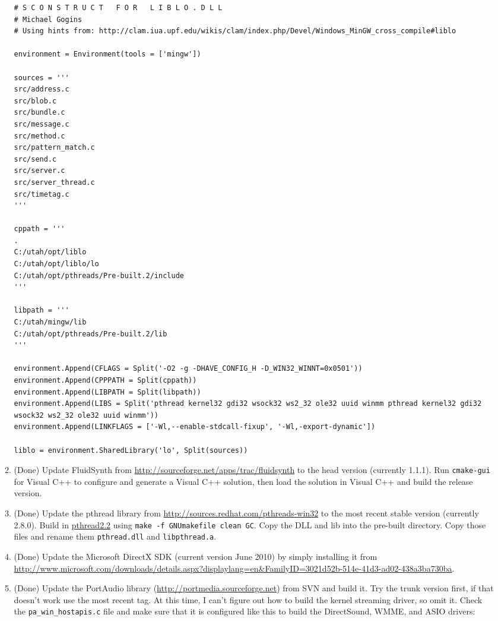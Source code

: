 \documentclass[11pt,letterpaper,onecolumn]{scrartcl}
\begin{document}
\begin{sloppypar}
\begin{enumerate}
\begin{enumerate}
\begin{lstlisting}
# S C O N S T R U C T   F O R   L I B L O . D L L
# Michael Gogins
# Using hints from: http://clam.iua.upf.edu/wikis/clam/index.php/Devel/Windows_MinGW_cross_compile#liblo

environment = Environment(tools = ['mingw'])

sources = '''
src/address.c
src/blob.c
src/bundle.c
src/message.c
src/method.c
src/pattern_match.c
src/send.c
src/server.c
src/server_thread.c
src/timetag.c
'''

cppath = '''
.
C:/utah/opt/liblo
C:/utah/opt/liblo/lo
C:/utah/opt/pthreads/Pre-built.2/include
'''

libpath = '''
C:/utah/mingw/lib
C:/utah/opt/pthreads/Pre-built.2/lib
'''

environment.Append(CFLAGS = Split('-O2 -g -DHAVE_CONFIG_H -D_WIN32_WINNT=0x0501'))
environment.Append(CPPPATH = Split(cppath))
environment.Append(LIBPATH = Split(libpath))
environment.Append(LIBS = Split('pthread kernel32 gdi32 wsock32 ws2_32 ole32 uuid winmm pthread kernel32 gdi32 wsock32 ws2_32 ole32 uuid winmm'))
environment.Append(LINKFLAGS = ['-Wl,--enable-stdcall-fixup', '-Wl,-export-dynamic'])

liblo = environment.SharedLibrary('lo', Split(sources))
\end{lstlisting}

 			\item (Done) Update FluidSynth from \url{http://sourceforge.net/apps/trac/fluidsynth} to the head version (currently 1.1.1). Run \texttt{cmake-gui} for Visual C++ to configure and generate a Visual C++ solution, then load the solution in Visual C++ and build the release version.
   		\item (Done) Update the pthread library from \url{http://sources.redhat.com/pthreads-win32} to the most recent stable version (currently 2.8.0). Build in \url{pthread2.2} using \verb|make -f GNUmakefile clean GC|. Copy the DLL and lib into the pre-built directory. Copy those files and rename them \texttt{pthread.dll} and \texttt{libpthread.a}.
   		\item (Done) Update the Microsoft DirectX SDK (current version June 2010) by simply installing it from \url{http://www.microsoft.com/downloads/details.aspx?displaylang=en&FamilyID=3021d52b-514e-41d3-ad02-438a3ba730ba}.
			\item (Done) Update the PortAudio library (\url{http://portmedia.sourceforge.net}) from SVN and build it. Try the trunk version first, if that doesn't work use the most recent tag. At this time, I can't figure out how to build the kernel streaming driver, so omit it. 
			Check the \verb|pa_win_hostapis.c| file and make sure that it is configured like this to build the DirectSound, WMME, and ASIO drivers:
			

\end{enumerate}
\end{enumerate}
\end{sloppypar}
\end{document}
